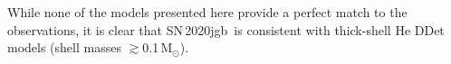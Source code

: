 \documentclass[twocolumn]{aastex631}
\newcommand{\sn}{SN\,2020jgb}
\newcommand{\Msun}{\mathrm{M_\odot}}
\begin{document}
While none of the models presented here provide a perfect match to the observations, it is clear that \sn\ is consistent with thick-shell He DDet models (shell masses $\gtrsim$0.1\,$\Msun$).






\end{document}
